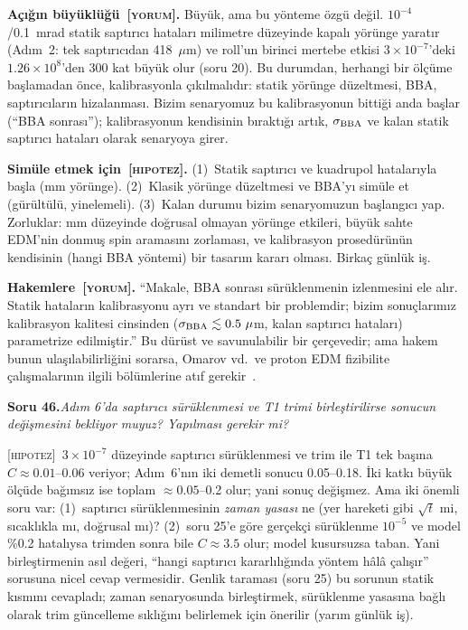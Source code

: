 \documentclass[11pt,a4paper]{article}
\newcommand{\YOR}{\textsc{[yorum]}}
\newcommand{\HIP}{\textsc{[hipotez]}}
\newcounter{soru}
\newcommand{\soru}[2]{%
  \par\medskip\noindent\textbf{Soru #1.}\enspace\textit{#2}\par\nopagebreak\smallskip}
\begin{document}
\textbf{Açığın büyüklüğü~\YOR.} Büyük, ama bu yönteme özgü değil. $10^{-4}$/0.1~mrad statik saptırıcı
hataları milimetre düzeyinde kapalı yörünge yaratır (Adım~2: tek saptırıcıdan 418~$\mu$m) ve roll'un birinci
mertebe etkisi $3\times10^{-7}$'deki $1.26\times10^{8}$'den 300 kat büyük olur (soru 20). Bu durumdan,
herhangi bir ölçüme başlamadan önce, kalibrasyonla çıkılmalıdır: statik yörünge düzeltmesi, BBA,
saptırıcıların hizalanması. Bizim senaryomuz bu kalibrasyonun bittiği anda başlar (``BBA sonrası''); kalibrasyonun
kendisinin bıraktığı artık, $\sigma_{\rm BBA}$ ve kalan statik saptırıcı hataları olarak senaryoya girer.

\textbf{Simüle etmek için~\HIP.} (1)~Statik saptırıcı ve kuadrupol hatalarıyla başla (mm yörünge). (2)~Klasik
yörünge düzeltmesi ve BBA'yı simüle et (gürültülü, yinelemeli). (3)~Kalan durumu bizim senaryomuzun
başlangıcı yap. Zorluklar: mm düzeyinde doğrusal olmayan yörünge etkileri, büyük sahte EDM'nin donmuş spin
aramasını zorlaması, ve kalibrasyon prosedürünün kendisinin (hangi BBA yöntemi) bir tasarım kararı olması.
Birkaç günlük iş.

\textbf{Hakemlere~\YOR.} ``Makale, BBA sonrası sürüklenmenin izlenmesini ele alır. Statik hataların
kalibrasyonu ayrı ve standart bir problemdir; bizim sonuçlarımız kalibrasyon kalitesi cinsinden
($\sigma_{\rm BBA}\lesssim0.5~\mu$m, kalan saptırıcı hataları) parametrize edilmiştir.'' Bu dürüst ve
savunulabilir bir çerçevedir; ama hakem bunun ulaşılabilirliğini sorarsa, Omarov vd.\ ve proton EDM
fizibilite çalışmalarının ilgili bölümlerine atıf gerekir~\cite{omarov,cpedm_feas}.

\soru{46}{Adım 6'da saptırıcı sürüklenmesi ve T1 trimi birleştirilirse sonucun değişmesini bekliyor muyuz?
Yapılması gerekir mi?}

\HIP~$3\times10^{-7}$ düzeyinde saptırıcı sürüklenmesi ve trim ile T1 tek başına $C\approx0.01$--0.06
veriyor; Adım~6'nın iki demetli sonucu 0.05--0.18. İki katkı büyük ölçüde bağımsız ise toplam
$\approx0.05$--0.2 olur; yani sonuç değişmez. Ama iki önemli soru var: (1)~saptırıcı sürüklenmesinin
\emph{zaman yasası} ne (yer hareketi gibi $\sqrt t$ mi, sıcaklıkla mı, doğrusal mı)? (2)~soru 25'e göre
gerçekçi sürüklenme $10^{-5}$ ve model \%0.2 hatalıysa trimden sonra bile $C\approx3.5$ olur; model
kusursuzsa taban. Yani birleştirmenin asıl değeri, ``hangi saptırıcı
kararlılığında yöntem hâlâ çalışır'' sorusuna nicel cevap vermesidir. Genlik taraması (soru 25) bu sorunun
statik kısmını cevapladı; zaman senaryosunda birleştirmek, sürüklenme yasasına bağlı olarak trim güncelleme
sıklığını belirlemek için önerilir (yarım günlük iş).
\end{document}

